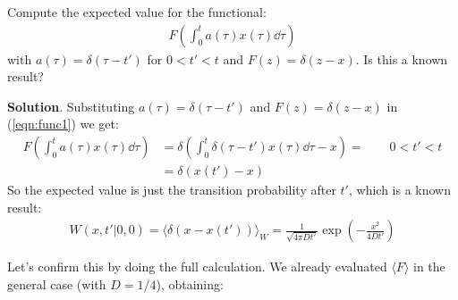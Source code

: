 \documentclass[../template.tex]{subfiles}
\begin{document}
\begin{exo}
    Compute the expected value for the functional:
    \begin{align}
        F\left(\int_0^t a(\tau) x(\tau) \dd{\tau }\right) \label{eqn:func1}
    \end{align}
    with $a(\tau) = \delta(\tau - t')$ for $0<t'<t$ and $F(z) = \delta (z-x)$. Is this a known result?

    \medskip

    \textbf{Solution}. Substituting $a(\tau) = \delta(\tau - t')$ and $F(z) = \delta(z-x)$ in (\ref{eqn:func1}) we get:
    \begin{align*}
        F\left(\int_0^t a(\tau) x(\tau) \dd{\tau}\right) &= \delta\left(\int_0^t \delta(\tau - t') x(\tau) \dd{\tau} -x\right) = \qquad 0<t'<t\\
        &= \delta(x(t') - x)
    \end{align*}
    So the expected value is just the transition probability after $t'$, which is a known result:
    \begin{align*}
        W(x,t'|0,0) = \langle \delta(x - x(t')) \rangle_W = \frac{1}{\sqrt{4 \pi D t'}} \exp\left(-\frac{x^2}{4D t'} \right) 
    \end{align*}

    Let's confirm this by doing the full calculation. We already evaluated $\langle F \rangle$ in the general case (with $D=1/4$), obtaining:


\end{exo}
\end{document}
